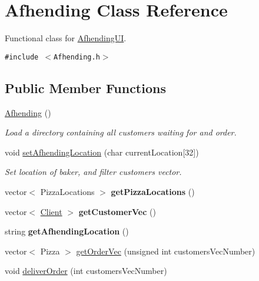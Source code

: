 \hypertarget{class_afhending}{
\section{Afhending Class Reference}
\label{class_afhending}
}
Functional class for \hyperlink{class_afhending_u_i}{Afhending\-UI}.  


{\tt \#include $<$Afhending.h$>$}

\subsection*{Public Member Functions}
\begin{CompactItemize}
\item 
\hypertarget{class_afhending_9365433a6f973ad929ffc0b458bc7c6f}{
\hyperlink{class_afhending_9365433a6f973ad929ffc0b458bc7c6f}{Afhending} ()}
\label{class_afhending_9365433a6f973ad929ffc0b458bc7c6f}

\begin{CompactList}\small\item\em Load a directory containing all customers waiting for and order. \item\end{CompactList}\item 
void \hyperlink{class_afhending_411cc45b50d4a59a33d76f6c54e52f78}{set\-Afhending\-Location} (char current\-Location\mbox{[}32\mbox{]})
\begin{CompactList}\small\item\em Set location of baker, and filter customers vector. \item\end{CompactList}\item 
\hypertarget{class_afhending_3d38e7498fba59674c7d3838bf4c1824}{
vector$<$ Pizza\-Locations $>$ {\bf get\-Pizza\-Locations} ()}
\label{class_afhending_3d38e7498fba59674c7d3838bf4c1824}

\item 
\hypertarget{class_afhending_3970b0afe27b514282442b11592e1602}{
vector$<$ \hyperlink{class_client}{Client} $>$ {\bf get\-Customer\-Vec} ()}
\label{class_afhending_3970b0afe27b514282442b11592e1602}

\item 
\hypertarget{class_afhending_543bc751e47e95a5382a13e161387a1b}{
string {\bf get\-Afhending\-Location} ()}
\label{class_afhending_543bc751e47e95a5382a13e161387a1b}

\item 
vector$<$ Pizza $>$ \hyperlink{class_afhending_ad0cbeddec394b25c5eade57247f4110}{get\-Order\-Vec} (unsigned int customers\-Vec\-Number)
\item 
void \hyperlink{class_afhending_b3cb078e2502d2eb7e6e67623cbe30b9}{deliver\-Order} (int customers\-Vec\-Number)
\end{CompactItemize}


